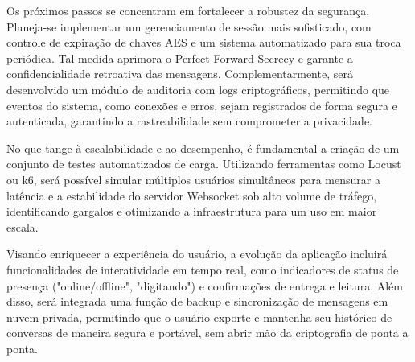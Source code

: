 Os próximos passos se concentram em fortalecer a robustez da
segurança. Planeja-se implementar um gerenciamento de sessão mais
sofisticado, com controle de expiração de chaves \acs{AES} e um sistema
automatizado para sua troca periódica. Tal medida aprimora o Perfect
Forward Secrecy e garante a confidencialidade retroativa das
mensagens. Complementarmente, será desenvolvido um módulo de
auditoria com logs criptográficos, permitindo que eventos do sistema,
como conexões e erros, sejam registrados de forma segura e
autenticada, garantindo a rastreabilidade sem comprometer a privacidade.

No que tange à escalabilidade e ao desempenho, é fundamental a
criação de um conjunto de testes automatizados de carga. Utilizando
ferramentas como Locust ou k6, será possível simular múltiplos
usuários simultâneos para mensurar a latência e a estabilidade do
servidor Websocket sob alto volume de tráfego, identificando gargalos
e otimizando a infraestrutura para um uso em maior escala.

Visando enriquecer a experiência do usuário, a evolução da aplicação
incluirá funcionalidades de interatividade em tempo real, como
indicadores de status de presença ("online/offline", "digitando") e
confirmações de entrega e leitura. Além disso, será integrada uma
função de backup e sincronização de mensagens em nuvem privada,
permitindo que o usuário exporte e mantenha seu histórico de
conversas de maneira segura e portável, sem abrir mão da criptografia
de ponta a ponta.

\newpage
